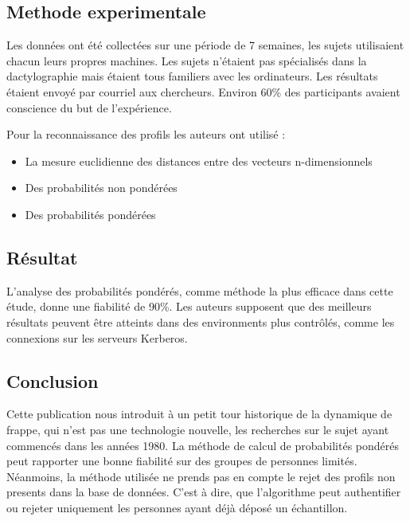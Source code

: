 \subsection{Methode experimentale}

Les données ont été collectées sur une période de 7 semaines, les sujets utilisaient chacun leurs propres machines. Les sujets n’étaient pas spécialisés dans la dactylographie mais étaient tous familiers avec les ordinateurs. Les résultats étaient envoyé par courriel aux chercheurs. Environ 60\% des participants avaient conscience du but de l’expérience.

Pour la reconnaissance des profils les auteurs ont utilisé :\\

\begin{itemize}
\item La mesure euclidienne des distances entre des vecteurs n-dimensionnels
\item Des probabilités non pondérées
\item Des probabilités pondérées
\end{itemize}

\subsection{Résultat}

L’analyse des probabilités pondérés, comme méthode la plus efficace dans cette étude, donne une fiabilité de 90\%. Les auteurs supposent que des meilleurs résultats peuvent être atteints dans des environments plus contrôlés, comme les connexions sur les serveurs Kerberos.

\subsection{Conclusion}

Cette publication nous introduit à un petit tour historique de la dynamique de frappe, qui n'est pas une technologie nouvelle, les recherches sur le sujet ayant commencés dans les années 1980. La méthode de calcul de probabilités pondérés peut rapporter une bonne fiabilité sur des groupes de personnes limités. Néanmoins, la méthode utilisée ne prends pas en compte le rejet des profils non presents dans la base de données. C’est à dire, que l’algorithme peut authentifier ou rejeter uniquement les personnes ayant déjà déposé un échantillon.
